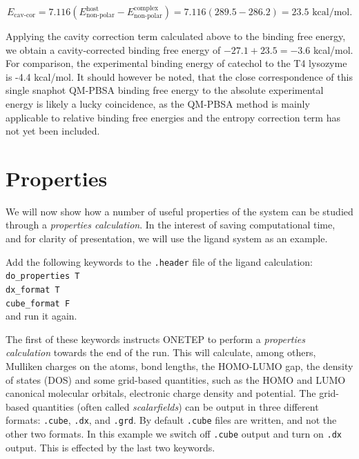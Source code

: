 \documentclass{article}
\begin{document}
\begin{equation}
    E_{\textrm{cav-cor}}=7.116(E^{\textrm{host}}_{\textrm{non-polar}}-E^{\textrm{complex}}_{\textrm{non-polar}})=7.116(289.5 - 286.2) = 23.5 \text{ kcal/mol}.
    \label{eq:cav-cor}
\end{equation}

Applying the cavity correction term calculated above to the binding free energy, we obtain a cavity-corrected binding free energy of $-27.1 + 23.5 = -3.6$ kcal/mol. For comparison, the experimental binding energy of catechol to the T4 lysozyme is -4.4 kcal/mol. It should however be noted, that the close correspondence of this single snaphot QM-PBSA binding free energy to the absolute experimental energy is likely a lucky coincidence, as the QM-PBSA method is mainly applicable to relative binding free energies and the entropy correction term has not yet been included. 

\section{Properties}
We will now show how a number of useful properties of the system can be studied through a \textit{properties calculation}. In the interest of saving computational time, and for clarity of presentation, we will use the ligand system as an example.

Add the following keywords to the \texttt{.header} file of the ligand calculation:\\

\noindent
\texttt{do\_properties T}\\
\texttt{dx\_format T}\\
\texttt{cube\_format F}\\

\noindent
and run it again. 

The first of these keywords instructs ONETEP to perform a \textit{properties calculation} towards the end of the run. This will calculate, among others, Mulliken charges on the atoms, bond lengths, the HOMO-LUMO gap, the density of states (DOS) and some grid-based quantities, such as the HOMO and LUMO canonical molecular orbitals, electronic charge density and potential. The grid-based quantities (often called \textit{scalarfields}) can be output in three different formats: \texttt{.cube}, \texttt{.dx}, and \texttt{.grd}. By default \texttt{.cube} files are written, and not the other two formats. In this example we switch off \texttt{.cube} output and turn on \texttt{.dx} output. This is effected by the last two keywords.
\end{document}
